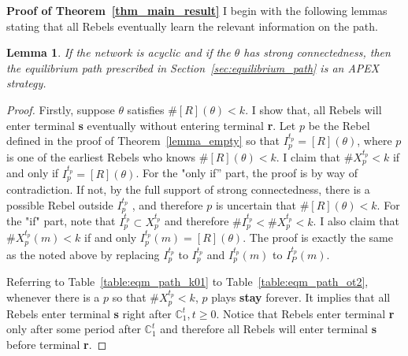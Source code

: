 \documentclass[12pt,letter]{article}
\newcommand{\Kappa}{\mathbb{C}}
\newtheorem{lemma}{Lemma}[section]
\theoremstyle{definition}
\theoremstyle{remark}
\theoremstyle{claim}
\begin{document}
\noindent\textbf{Proof of Theorem~\ref{thm_main_result}}
I begin with the following lemmas stating that all Rebels eventually learn the relevant information on the path.
\begin{lemma}
\label{lemma:learning_on_the_path}
If the network is acyclic and if the $\theta$ has strong connectedness, then the equilibrium path prescribed in Section~\ref{sec:equilibrium_path} is an APEX strategy.
\end{lemma}
\begin{proof}
Firstly, suppose $\theta$ satisfies $\#[R](\theta)<k$. I show that, all Rebels will enter terminal \textbf{s} eventually without entering terminal \textbf{r}.  Let $p$ be the Rebel defined in the proof of Theorem~\ref{lemma_empty} so that $I^{t_p}_p=[R](\theta)$, where $p$ is one of the earliest Rebels who knows $\#[R](\theta)<k$. I claim that $\#X^{t_p}_p< k$ if and only if $I^{t_p}_p=[R](\theta)$. For the "only if'' part, the proof is by way of contradiction. If not, by the full support of strong connectedness, there is a possible Rebel outside $I^{t_p}_p$ , and therefore $p$ is uncertain that $\#[R](\theta)<k$. For the "if" part, note that $I^{t_p}_p\subset X^{t_p}_p$ and therefore $\#I^{t_p}_p< \#X^{t_p}_p<k$. I also claim that $\#X^{t_p}_p(m)<k$ if and only $I^{t_p}_p(m)=[R](\theta)$. The proof is exactly the same as the noted above by replacing $I^{t_p}_p$ to $I^{t_p}_p$ and $I^{t_p}_p(m)$ to $I^{t_p}_P(m)$.

Referring to Table~\ref{table:eqm_path_k01} to Table~\ref{table:eqm_path_ot2}, whenever there is a $p$ so that $\#X^{t_p}_p<k$, $p$ plays \textbf{stay} forever. It implies that all Rebels enter terminal \textbf{s} right after $\Kappa^t_1, t\geq 0$. Notice that Rebels enter terminal \textbf{r} only after some period after $\Kappa^t_1$ and therefore all Rebels will enter terminal \textbf{s} before terminal \textbf{r}. 


\end{proof}
\end{document}
